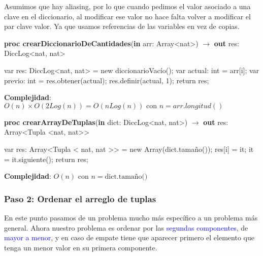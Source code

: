 \documentclass{article}
\newcommand{\Complexity}[1]{\textbf{Complejidad}: #1}
\begin{document}
Asumimos que hay aliasing, por lo que cuando pedimos el valor asociado a una clave en el diccionario, al modificar ese valor no hace falta volver a modificar el par clave valor. Ya que usamos referencias de las variables en vez de copias. 
\begin{algorithm}[H]
    \caption{
        \textbf{proc crearDiccionarioDeCantidades}(\textbf{in} arr: \textnormal{Array\textless{}nat\textgreater{}}) $\to$ \textbf{out} res:  \textnormal{DiccLog\textless{}nat, nat\textgreater{}}
    }
    \begin{algorithmic}[1]
        \State var res: \textnormal{DiccLog\textless{}nat, nat\textgreater{}} = new diccionarioVacío();  
            \State var actual: int = arr[i]; 
             
                \State var previo: int = res.obtener(actual); 
            \Else
                \State res.definir(actual, 1); 
            \EndIf 
        \EndFor
    \State return res;
    \end{algorithmic}
    \Complexity{$O(n) \times O(2Log(n)) = O(nLog(n)) \text{ con } n = arr.longitud()$ }
\end{algorithm}
\begin{algorithm}[H]
    \caption{
        \textbf{proc crearArrayDeTuplas}(\textbf{in} dict: \textnormal{DiccLog\textless{}nat, nat\textgreater{}}) $\to$ \textbf{out} res: \textnormal{Array\textless{}Tupla \textless{}nat, nat\textgreater{}\textgreater{}}
    }
    \begin{algorithmic}[1]
        \State var res: Array\textless{}Tupla \textless{} nat, nat \textgreater{}\textgreater{} = new Array(dict.tamaño()); 
         
         
            \State res[i] = it; 
            \State it = it.siguiente(); 
        \EndFor
        \State return res;
    \end{algorithmic}
    \Complexity{$O(n) \text{ con } n = \text{dict.tamaño()}$}
\end{algorithm}
\vspace{-1.2em}
\subsubsection*{Paso 2: Ordenar el arreglo de tuplas}
En este punto pasamos de un problema mucho más específico a un problema más general.
Ahora nuestro problema es ordenar por las \textcolor{blue}{segundas componentes}, de \textcolor{blue}{mayor a menor}, y en \textcolor{violetDark}{caso de empate} tiene que aparecer primero el elemento que tenga un \textcolor{violetDark}{menor valor en su primera componente}.
\end{document}
